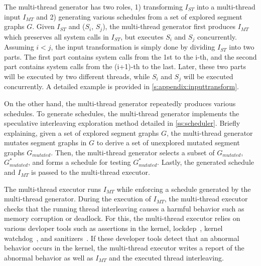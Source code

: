 %
%
%
%
%
The multi-thread generator has two roles, 1) transforming $I_{ST}$
into a multi-thread input $I_{MT}$ and 2) generating various
schedules from a set of explored segment graphs $G$.
%
%   
Given $I_{ST}$ and ($S_i$, $S_j$), the multi-thread generator first
produces $I_{MT}$ which preserves all system calls in $I_{ST}$, but
executes $S_i$ and $S_j$ concurrently.
%
Assuming $i < j$, the input transformation is simply done by dividing
$I_{ST}$ into two parts.
%
The first part contains system calls from the 1st to the i-th, and the
second part contains system calls from the (i+1)-th to the last.
%
Later, these two parts will be executed by two different threads,
while $S_i$ and $S_j$ will be executed concurrently. A detailed
example is provided in \autoref{s:appendix:inputtransform}.



On the other hand, the multi-thread generator repeatedly produces
various schedules.
%
To generate schedules, the multi-thread generator implements the
speculative interleaving exploration method detailed in
\autoref{ss:scheduler}.
%
Briefly explaining, given a set of explored segment graphs $G$, the
multi-thread generator mutates segment graphs in $G$ to derive a set
of unexplored mutated segment graphs $G_{mutated}$.
%
Then, the multi-thread generator selects a subset of $G_{mutated}$,
$G^{*}_{mutated}$, and forms a schedule for testing $G^*_{mutated}$.
%
Lastly, the generated schedule and $I_{MT}$ is passed to the
multi-thread executor.






%
The multi-thread executor runs $I_{MT}$ while enforcing a schedule
generated by the multi-thread generator.
%
During the execution of $I_{MT}$, the multi-thread executor checks
that the running thread interleaving causes a harmful behavior such as
memory corruption or deadlock.
%
For this, the multi-thread executor relies on various devloper tools
such as assertions in the kernel, lockdep~\cite{lockdep}, kernel
watchdog~\cite{watchdog}, and sanitizers~\cite{kasan, ubsan, asan}.
%
If these developer tools detect that an abnormal behavior occurs in
the kernel, the multi-thread executor writes a report of the abnormal
behavior as well as $I_{MT}$ and the executed thread interleaving.







